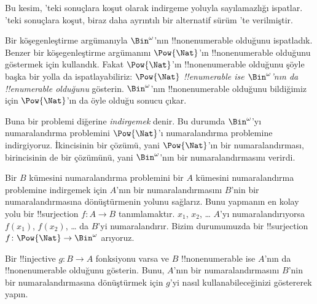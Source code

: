 \documentclass[../../../include/open-logic-section]{subfiles}
\begin{document}


\begin{editorial}
  Bu kesim, 'teki sonuçlara koşut olarak indirgeme yoluyla
  sayılamazlığı ispatlar. 'teki sonuçlara koşut, biraz daha
  ayrıntılı bir alternatif sürüm 'te verilmiştir.
\end{editorial}

Bir köşegenleştirme argümanıyla $\Bin^\omega$'nın !!{nonenumerable}
olduğunu ispatladık. Benzer bir köşegenleştirme argümanını $\Pow{\Nat}$'ın
!!{nonenumerable} olduğunu göstermek için kullandık. Fakat $\Pow{\Nat}$'ın
!!{nonenumerable} olduğunu şöyle başka bir yolla da ispatlayabiliriz:
\emph{$\Pow{\Nat}$ !!{enumerable} ise $\Bin^\omega$'nın da !!{enumerable}
olduğunu} gösterin. $\Bin^\omega$'nın !!{nonenumerable} olduğunu bildiğimiz
için $\Pow{\Nat}$'ın da öyle olduğu sonucu çıkar.

Buna bir problemi diğerine \emph{indirgemek} denir. Bu durumda
$\Bin^\omega$'yı numaralandırma problemini $\Pow{\Nat}$'ı numaralandırma
problemine indirgiyoruz. İkincisinin bir çözümü, yani $\Pow{\Nat}$'ın bir
numaralandırması, birincisinin de bir çözümünü, yani $\Bin^\omega$'nın bir
numaralandırmasını verirdi.

Bir $B$ kümesini numaralandırma problemini bir $A$ kümesini numaralandırma
problemine indirgemek için $A$'nın bir numaralandırmasını $B$'nin bir
numaralandırmasına dönüştürmenin yolunu sağlarız. Bunu yapmanın en kolay yolu
bir !!{surjection} $f\colon A\to B$ tanımlamaktır. $x_1$, $x_2$, \dots{}
$A$'yı numaralandırıyorsa $f(x_1)$, $f(x_2)$, \dots{} da $B$'yi
numaralandırır. Bizim durumumuzda bir !!{surjection}
$f\colon\Pow{\Nat}\to\Bin^\omega$ arıyoruz.

\begin{prob}
Bir !!{injective} $g\colon B\to A$ fonksiyonu varsa ve $B$
!!{nonenumerable} ise $A$'nın da !!{nonenumerable} olduğunu gösterin. Bunu,
$A$'nın bir numaralandırmasını $B$'nin bir numaralandırmasına dönüştürmek
için $g$'yi nasıl kullanabileceğinizi göstererek yapın.
\end{prob}
\end{document}
